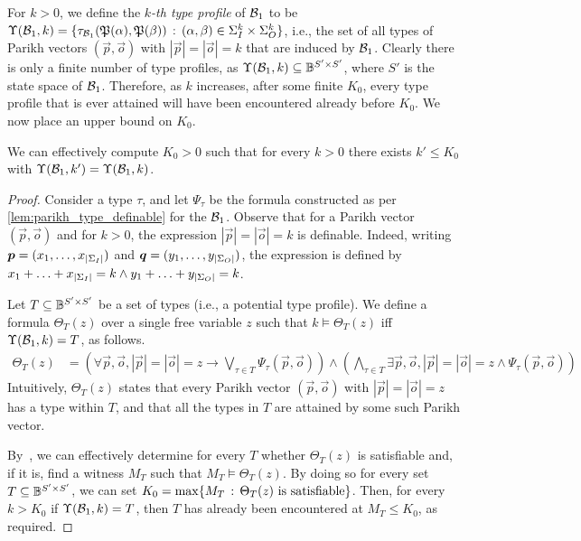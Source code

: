 For $k>0$, we define the \emph{$k$-th type profile} of $\mathcal{B}_1$ to be $\Upsilon(\mathcal{B}_1,k)=\{\tau_{\mathcal{B}_1}(\mathfrak{P}(\alpha),\mathfrak{P}(\beta))\, :\, (\alpha,\beta)\in \Sigma_{I}^k \times \Sigma_{O}^k\}$, i.e., the set of all types of Parikh vectors $(\vec{p},\vec{o})$ with $|\vec{p}|=|\vec{o}|=k$ that are induced by $\mathcal{B}_1$. Clearly there is only a finite number of type profiles, as $\Upsilon(\mathcal{B}_1,k)\subseteq \mathbb{B}^{S'\times S'}$, where $S'$ is the state space of $\mathcal{B}_1$. Therefore, as $k$ increases, after some finite $K_0$, every type profile that is ever attained will have been encountered already before $K_0$. We now place an upper bound on $K_0$.

\begin{lemma}
	\label{lem:type_profile_bound}
	We can effectively compute $K_0>0$ such that for every $k>0$ there exists $k'\le K_0$ with $\Upsilon(\mathcal{B}_1,k')=\Upsilon(\mathcal{B}_1,k)$.
	\end{lemma}
\begin{proof}
	Consider a type $\tau$, and let $\Psi_\tau$ be the \PA formula constructed as per \autoref{lem:parikh_type_definable} for the \NFA $\mathcal{B}_1$. Observe that for a Parikh vector $(\vec{p},\vec{o})$ and for $k>0$, the expression $|\vec{p}|=|\vec{o}|=k$ is \PA definable. Indeed, writing $\boldsymbol{p}=(x_1,\ldots,x_{|\Sigma_{I}|})$ and $\boldsymbol{q}=(y_1,\ldots,y_{|\Sigma_{O}|})$, the expression is defined by $x_1+\ldots+x_{|\Sigma_{I}|}=k \wedge y_1+\ldots+y_{|\Sigma_{O}|}=k$.
	
	Let $T\subseteq \mathbb{B}^{S'\times S'}$ be a set of types (i.e., a potential type profile). We define a \PA formula $\Theta_T(z)$ over a single free variable $z$ such that $k\models \Theta_T(z)$ iff $\Upsilon(\mathcal{B}_1,k)=T$, as follows.
	\begin{align*}
		\Theta_T(z)&=\left(\forall \vec{p},\vec{o}, |\vec{p}|=|\vec{o}|=z \to \bigvee_{\tau\in T}\Psi_\tau(\vec{p},\vec{o})\right)
		\wedge \left(\bigwedge_{\tau\in T}\exists \vec{p},\vec{o}, |\vec{p}|=|\vec{o}|=z \wedge \Psi_\tau(\vec{p},\vec{o})\right)
	\end{align*}
Intuitively, $\Theta_T(z)$ states that every Parikh vector $(\vec{p},\vec{o})$ with $|\vec{p}|=|\vec{o}|=z$ has a type within $T$, and that all the types in $T$ are attained by some such Parikh vector.

By~\cite{Fischer1974,Borosh1976}, we can effectively determine for every $T$ whether $\Theta_T(z)$ is satisfiable and, if it is, find a witness $M_T$ such that $M_T\models \Theta_T(z)$. By doing so for every set $T\subseteq \mathbb{B}^{S'\times S'}$, we can set $K_0=\max\{M_T\, :\, \Theta_T(z) \text{ is satisfiable}\}$. Then, for every $k>K_0$ if $\Upsilon(\mathcal{B}_1,k)=T$, then $T$ has already been encountered at $M_T\le K_0$, as required. 
\end{proof}

